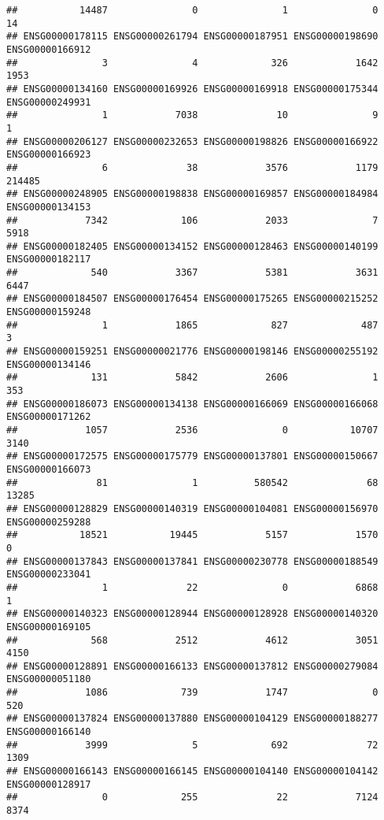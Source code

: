 \documentclass[
]{article}
\begin{document}
\begin{verbatim}
##           14487               0               1               0              14 
## ENSG00000178115 ENSG00000261794 ENSG00000187951 ENSG00000198690 ENSG00000166912 
##               3               4             326            1642            1953 
## ENSG00000134160 ENSG00000169926 ENSG00000169918 ENSG00000175344 ENSG00000249931 
##               1            7038              10               9               1 
## ENSG00000206127 ENSG00000232653 ENSG00000198826 ENSG00000166922 ENSG00000166923 
##               6              38            3576            1179          214485 
## ENSG00000248905 ENSG00000198838 ENSG00000169857 ENSG00000184984 ENSG00000134153 
##            7342             106            2033               7            5918 
## ENSG00000182405 ENSG00000134152 ENSG00000128463 ENSG00000140199 ENSG00000182117 
##             540            3367            5381            3631            6447 
## ENSG00000184507 ENSG00000176454 ENSG00000175265 ENSG00000215252 ENSG00000159248 
##               1            1865             827             487               3 
## ENSG00000159251 ENSG00000021776 ENSG00000198146 ENSG00000255192 ENSG00000134146 
##             131            5842            2606               1             353 
## ENSG00000186073 ENSG00000134138 ENSG00000166069 ENSG00000166068 ENSG00000171262 
##            1057            2536               0           10707            3140 
## ENSG00000172575 ENSG00000175779 ENSG00000137801 ENSG00000150667 ENSG00000166073 
##              81               1          580542              68           13285 
## ENSG00000128829 ENSG00000140319 ENSG00000104081 ENSG00000156970 ENSG00000259288 
##           18521           19445            5157            1570               0 
## ENSG00000137843 ENSG00000137841 ENSG00000230778 ENSG00000188549 ENSG00000233041 
##               1              22               0            6868               1 
## ENSG00000140323 ENSG00000128944 ENSG00000128928 ENSG00000140320 ENSG00000169105 
##             568            2512            4612            3051            4150 
## ENSG00000128891 ENSG00000166133 ENSG00000137812 ENSG00000279084 ENSG00000051180 
##            1086             739            1747               0             520 
## ENSG00000137824 ENSG00000137880 ENSG00000104129 ENSG00000188277 ENSG00000166140 
##            3999               5             692              72            1309 
## ENSG00000166143 ENSG00000166145 ENSG00000104140 ENSG00000104142 ENSG00000128917 
##               0             255              22            7124            8374 

\end{verbatim}
\end{document}
